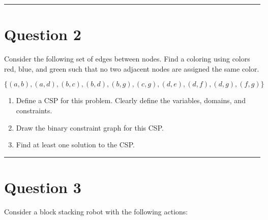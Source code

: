 \documentclass[11pt]{article}
\begin{document}
\begin{flushleft}
\rule[0.1pt]{40em}{1.0pt}

\section*{Question 2}
Consider the following set of edges between nodes. Find a coloring using colors
red, blue, and green such that no two adjacent nodes are assigned the same
color.

\begin{center}
$\{ (a, b),(a, d),(b, c),(b, d),(b, g),(c, g),(d, e),(d, f),(d, g),(f, g) \}$
\end{center}

\begin{enumerate}[label=(\alph*)]
\itemsep1em

    \item Define a CSP for this problem. Clearly define the variables, domains,
        and constraints.
        
    \item Draw the binary constraint graph for this CSP.

    \item Find at least one solution to the CSP. 

\end{enumerate}
\rule[0.1pt]{40em}{1.0pt}

\section*{Question 3}
Consider a block stacking robot with the following actions:


\end{flushleft}
\end{document}
